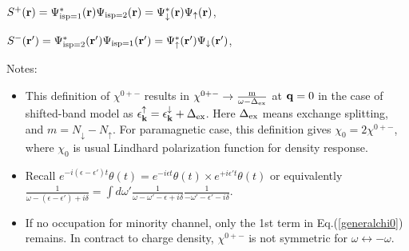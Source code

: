 \documentclass[a4paper,10pt,epsf,fleqn]{article}
\newcommand{\bfk}{{\bf k}}
\newcommand{\bfr}{{\bf r}}
\newcommand{\ispone}{\downarrow}
\newcommand{\isptwo}{\uparrow}
\newcommand{\eps}{\epsilon}
\newcommand{\req}[1]{Eq.(\ref{#1})}
\begin{document}
{{{\noindent $S^+(\bfr) = \Psi_{\rm isp=1}^*(\bfr) \Psi_{\rm isp=2}(\bfr) 
= \Psi_{\rm \ispone}^*(\bfr) \Psi_{\rm \isptwo}(\bfr)$, 

\noindent $S^-(\bfr') = \Psi_{\rm isp=2}^*(\bfr') \Psi_{\rm isp=1}(\bfr') 
= \Psi_{\rm \isptwo}^*(\bfr') \Psi_{\rm \ispone}(\bfr')$, \ 



\noindent Notes:
\begin{itemize}
\item This definition of $\chi^{0+-}$ 
results in $\chi^{0+-} \to \frac{\rm m}{\omega-\Delta_{\rm ex}}$
at ${\bf q}=0$ in the case of shifted-band model as 
$\epsilon_\bfk^\isptwo = \epsilon_\bfk^\ispone + \Delta_{\rm ex}$.
Here $\Delta_{\rm ex}$ means exchange splitting, and $m = N_\ispone- N_\isptwo$.
For paramagnetic case, this definition gives $\chi_0 = 2 \chi^{0+-}$, where
 $\chi_0$ is usual Lindhard polarization function for density response.

\item Recall 
$ e^{-i (\eps-\eps') t} \theta(t)  = e^{-i \eps t} \theta(t) \times e^{+i \eps' t} \theta(t)$ 
or equivalently 
$ \frac{1}{\omega-(\eps-\eps')+i \delta}= \int d\omega' \frac{1}{\omega-\omega'-\eps+i \delta} \frac{1}{-\omega'-\eps'-i \delta}$.

\item If no occupation for minority channel, only the 1st term in \req{generalchi0} remains.
In contract to charge density, $\chi^{0+-}$ is not symmetric for $\omega \leftrightarrow -\omega$. 
\end{itemize}

}}}
\end{document}
